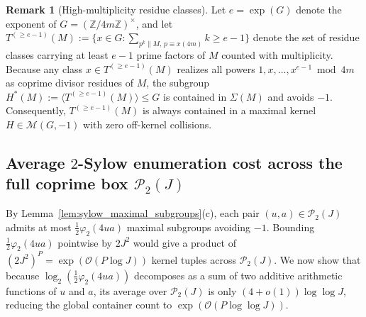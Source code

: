 \documentclass[11pt, a4paper]{article}
\theoremstyle{plain}
\theoremstyle{definition}
\newtheorem{remark}[theorem]{Remark}
\newcommand{\Z}{\mathbb{Z}}
\begin{document}
\begin{remark}[High-multiplicity residue classes]\label{prop:subgroup_restoration}
Let $e=\exp(G)$ denote the exponent of $G=(\Z/4m\Z)^{\times}$, and let $T^{(\ge e-1)}(M):=\{x\in G:\sum_{p^{k}\parallel M,\,p\equiv x(4m)}k\ge e-1\}$ denote the set of residue classes carrying at least $e-1$ prime factors of $M$ counted with multiplicity. Because any class $x\in T^{(\ge e-1)}(M)$ realizes all powers $1,x,\dots,x^{e-1}\bmod 4m$ as coprime divisor residues of $M$, the subgroup $H^{\ast}(M):=\langle T^{(\ge e-1)}(M)\rangle\le G$ is contained in $\Sigma(M)$ and avoids $-1$. Consequently, $T^{(\ge e-1)}(M)$ is always contained in a maximal kernel $H\in\mathcal{M}(G,-1)$ with zero off-kernel collisions.
\end{remark}

\subsection{Average $2$-Sylow enumeration cost across the full coprime box $\mathcal{P}_2(J)$}\label{subsec:average_sylow_cost}

By Lemma~\ref{lem:sylow_maximal_subgroups}(c), each pair $(u,a)\in\mathcal{P}_2(J)$ admits at most $\frac12\varphi_2(4ua)$ maximal subgroups avoiding $-1$. Bounding $\frac12\varphi_2(4ua)$ pointwise by $2J^{2}$ would give a product of $(2J^{2})^{P}=\exp(\mathcal{O}(P\log J))$ kernel tuples across $\mathcal{P}_2(J)$. We now show that because $\log_2(\frac12\varphi_2(4ua))$ decomposes as a sum of two additive arithmetic functions of $u$ and $a$, its average over $\mathcal{P}_2(J)$ is only $(4+o(1))\log\log J$, reducing the global container count to $\exp(\mathcal{O}(P\log\log J))$.
\end{document}
